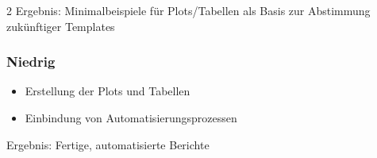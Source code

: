 \documentclass[
  a4paper,
  twoside]{article}
\providecommand{\tightlist}{%
  \setlength{\itemsep}{0pt}\setlength{\parskip}{0pt}}
\begin{document}
\begin {multicols}{2}
Ergebnis: Minimalbeispiele für Plots/Tabellen als Basis zur Abstimmung zukünftiger Templates

\hypertarget{niedrig}{%
\subsubsection{Niedrig}\label{niedrig}}

\begin{itemize}
\tightlist
\item
  Erstellung der Plots und Tabellen
\item
  Einbindung von Automatisierungsprozessen
\end{itemize}

Ergebnis: Fertige, automatisierte Berichte

\end {multicols}
\end{document}
